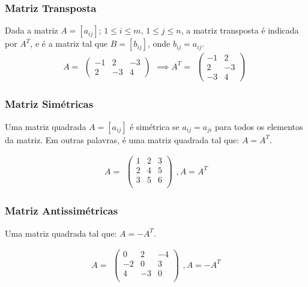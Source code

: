 \documentclass[12pt]{article}
\begin{document}
\subsubsection{Matriz Transposta}
Dada a matriz $A=[a_{ij}]$; $1 \leq i \leq m \text{, } 1 \leq j \leq n$, a matriz transposta é indicada por
$A^T$, e é a matriz tal que $B=[b_{ij}]$, onde $b_{ij} = a_{ij}$.
\noindent
\[
A =
    \begin{array}{c}
        \begin{pmatrix}
            -1  &  2  & -3 \\
            2  & -3  &  4
        \end{pmatrix}
    \end{array}
\implies
A^T = 
    \begin{array}{c}
        \begin{pmatrix}
            -1  &  2 \\
             2  & -3 \\
            -3  &  4
        \end{pmatrix}
    \end{array}
\]

\subsubsection{Matriz Simétricas}
Uma matriz quadrada $A=[a_{ij}]$ é simétrica se $a_{ij} = a_{ji}$ para todos os elementos da matriz. Em outras palavras, é uma matriz quadrada tal que: $A = A^T$.

\[
A =
    \begin{array}{c}
        \begin{pmatrix}
            1  &  2  &  3 \\
            2  &  4  &  5 \\
            3  &  5  &  6 \\
        \end{pmatrix}
    \end{array}
, A=A^T
\]

\subsubsection{Matriz Antissimétricas}
Uma matriz quadrada tal que: $A = -A^T$.

\[
A =
    \begin{array}{c}
        \begin{pmatrix}
            0  &  2  & -4 \\
           -2  &  0  &  3 \\
            4  & -3  &  0 \\
        \end{pmatrix}
    \end{array}
, A=-A^T
\]
\end{document}
